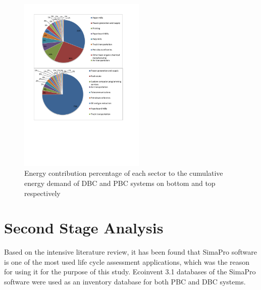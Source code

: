 \documentclass[conference]{IEEEtran}
\begin{document}

\begin{figure}[h]
\centering
\includegraphics[width=6cm]{screen3.pdf}
\caption{Energy contribution percentage of each sector to the cumulative energy demand of DBC and PBC systems on bottom and top respectively}
\label{screecn3Sectors}
\end{figure}

\section{Second Stage Analysis}
Based on the intensive literature review, it has been found that SimaPro software is one of the most used life cycle assessment applications, which was the reason for using it for the purpose of this study. Ecoinvent 3.1 databases of the SimaPro software were used as an inventory database for both PBC and DBC systems.
\end{document}
